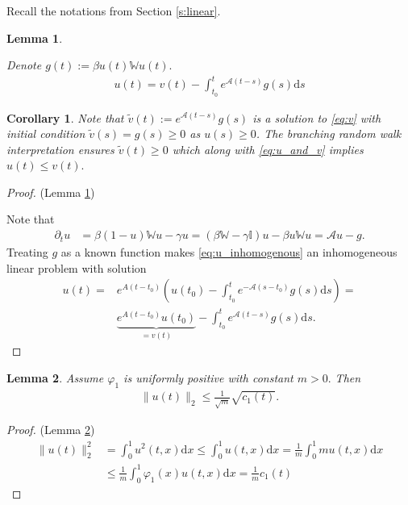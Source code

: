 \documentclass{article}
\renewcommand{\d}{\mathrm{d}}
\newcommand{\W}{\mathbb{W}}
\newcommand{\1}[1]{{\mathds{1}}_{\left\{#1\right\}}}
\newtheorem{lemma}{Lemma}
\newtheorem{corollary}{Corollary}
\begin{document}
Recall the notations from Section \ref{s:linear}.

\begin{lemma}
	\label{l:u_and_v}
	
	Denote $g(t):=\beta u(t) \W u(t).$
	\begin{align}
		\label{eq:u_and_v}
		u(t)=v(t)-\int_{t_0}^{t}e^{\mathcal{A}(t-s)}g(s) \d s
	\end{align}
\end{lemma}
\begin{corollary}
	Note that $\tilde{v}(t):=e^{\mathcal{A}(t-s)}g(s)$ is a solution to \eqref{eq:v} with initial condition $\tilde{v}(s)=g(s) \geq 0$ as $u(s) \geq 0$. The branching random walk interpretation ensures $\tilde{v}(t) \geq 0$ which along with \eqref{eq:u_and_v} implies $u(t) \leq v(t).$
\end{corollary}


\begin{proof} (Lemma \ref{l:u_and_v})
	
	Note that
	\begin{align}
		\label{eq:u_inhomogenous}
		\partial_t u&=\beta(1-u)\W u-\gamma u=(\beta \W-\gamma \mathbb{I})u-\beta u \W u=\mathcal{A}u-g.
	\end{align}
	Treating $g$ as a known function makes \eqref{eq:u_inhomogenous} an inhomogeneous linear problem with solution
	\begin{align*}
		u(t)=&e^{A(t-t_0)} \left(u(t_0)-\int_{t_0}^{t}e^{-\mathcal{A}(s-t_0)}g(s) \d s\right)=\\
		& \underbrace{e^{A(t-t_0)}u(t_0)}_{=v(t)}-\int_{t_0}^{t}e^{\mathcal{A}(t-s)}g(s) \d s.
	\end{align*}
\end{proof}

\begin{lemma}
	\label{l:c1_bound}
	Assume $\varphi_1$ is uniformly positive with constant $m>0.$ Then 
	\begin{align*}	
		\|u(t) \|_2 \leq \frac{1}{\sqrt{m}}\sqrt{c_1(t)}.
	\end{align*}
\end{lemma}
\begin{proof}(Lemma \ref{l:c1_bound})	
	\begin{align*}
		\|u(t) \|_2^2&=\int_{0}^{1}u^2(t,x) \d x \leq \int_{0}^{1}u(t,x) \d x= \frac{1}{m}\int_{0}^{1}mu(t,x) \d x\\
		&  \leq \frac{1}{m}\int_{0}^{1}\varphi_1(x)u(t,x) \d x =\frac{1}{m}c_1(t)
	\end{align*}
\end{proof}
\end{document}
